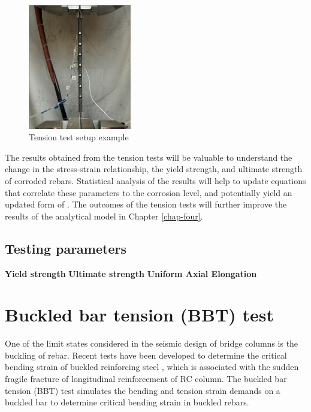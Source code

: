 \begin{figure}[htbp]
	\centering
	\includegraphics[width=0.4\textwidth]{Chapter-3/figs/TensionTest}
	\caption{Tension test setup example\cite{Overby2016}}
	\label{fig:TensionTest}
\end{figure}

The results obtained from the tension tests will be valuable to understand the change in the stress-strain relationship, the yield strength, and ultimate strength of corroded rebars. Statistical analysis of the results will help to update equations that correlate these parameters to the corrosion level, and potentially yield an updated form of  . The outcomes of the tension tests will further improve the results of the analytical model in Chapter \ref{chap-four}.

\subsection{Testing parameters}
\textbf{Yield strength}
\textbf{Ultimate strength}
\textbf{Uniform Axial Elongation}
\newline

\section{Buckled bar tension (BBT) test}

One of the limit states considered in the seismic design of bridge columns is the buckling of rebar. Recent tests have been developed to determine the critical bending strain of buckled reinforcing steel \cite{Barcley2019}, which is associated with the sudden fragile fracture of longitudinal reinforcement of RC column. The buckled bar tension (BBT) test simulates the bending and tension strain demands on a buckled bar to determine critical bending strain in buckled rebars. 

